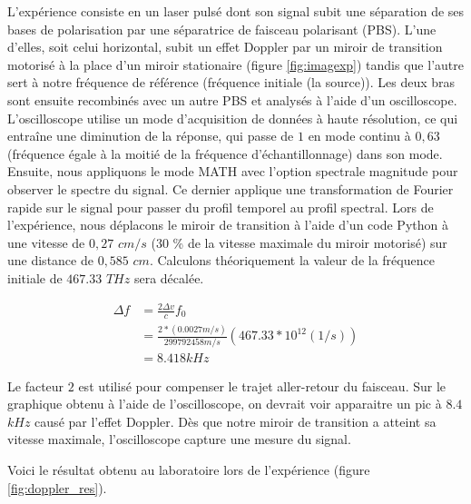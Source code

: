 \begin{onehalfspace}
    \noindent L’expérience consiste en un laser pulsé dont son signal subit une 
    séparation de ses bases de polarisation par 
    une séparatrice de faisceau polarisant (PBS). 
    L’une d’elles, soit celui horizontal, subit 
    un effet Doppler par un miroir de transition 
    motorisé à la place d'un miroir stationaire (figure \ref{fig:imagexp}) tandis que l’autre sert à notre 
    fréquence de référence (fréquence initiale 
    (la source)). Les deux bras sont ensuite 
    recombinés avec un autre PBS et analysés à l’aide d’un oscilloscope. 
    L’oscilloscope utilise un mode d’acquisition 
    de données à haute résolution, ce qui entraîne 
    une diminution de la réponse, qui passe de 
    $1$ en mode continu à $0,63$
    (fréquence égale à la moitié de la fréquence 
    d’échantillonnage) dans son mode. Ensuite, nous appliquons 
    le mode MATH avec l’option spectrale 
    magnitude pour observer le spectre du signal. 
    Ce dernier applique une transformation de 
    Fourier rapide sur le signal pour passer du 
    profil temporel au profil spectral. Lors de 
    l'expérience, nous déplacons le miroir de 
    transition à l'aide d'un code Python à une 
    vitesse de $0,27$ $cm/s$ ($30$ \% de 
    la vitesse maximale du miroir motorisé) sur une distance de 
    $0,585$ $cm$. Calculons théoriquement 
    la valeur de la fréquence initiale de $467.33$ $THz$ sera 
    décalée. 
\end{onehalfspace}

\begin{align}
    \Delta f &= \frac{2\Delta v}{c}f_0\\
    &= \frac{2*(0.0027 m/s)}{299792458 m/s}(467.33*10^{12} (1/s))\\
    &= 8.418kHz
\end{align}

\begin{onehalfspace}
    \noindent Le facteur $2$ est utilisé pour compenser le 
    trajet aller-retour du faisceau. Sur le 
    graphique obtenu à l’aide de l’oscilloscope, 
    on devrait voir apparaitre un pic à $8.4$ $kHz$ 
    causé par l’effet Doppler. Dès que notre 
    miroir de transition a atteint sa vitesse 
    maximale, l’oscilloscope capture une mesure 
    du signal. 
    
    \noindent Voici le résultat obtenu au laboratoire
    lors de l’expérience (figure \ref{fig:doppler_res}).
\end{onehalfspace}



